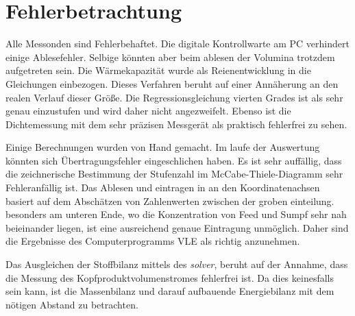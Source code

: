 \section{Fehlerbetrachtung}
\label{sec:fehler}

Alle Messonden sind Fehlerbehaftet. Die digitale Kontrollwarte am PC verhindert einige Ablesefehler. Selbige könnten aber beim ablesen der Volumina trotzdem aufgetreten sein. Die Wärmekapazität wurde als Reienentwicklung in die Gleichungen einbezogen. Dieses Verfahren beruht auf einer Annäherung an den realen Verlauf dieser Größe. Die Regressionsgleichung vierten Grades ist als sehr genau einzustufen und wird daher nicht angezweifelt. Ebenso ist die Dichtemessung mit dem sehr präzisen Messgerät als praktisch fehlerfrei zu sehen.

Einige Berechnungen wurden von Hand gemacht. Im laufe der Auswertung könnten sich Übertragungsfehler eingeschlichen haben. Es ist sehr auffällig, dass die zeichnerische Bestimmung der Stufenzahl im McCabe-Thiele-Diagramm sehr Fehleranfällig ist. Das Ablesen und eintragen in an den Koordinatenachsen basiert auf dem Abschätzen von Zahlenwerten zwischen der groben einteilung. besonders am unteren Ende, wo die Konzentration von Feed und Sumpf sehr nah beieinander liegen, ist eine ausreichend genaue Eintragung unmöglich. Daher sind die Ergebnisse des Computerprogramms VLE als richtig anzunehmen.


Das Ausgleichen der Stoffbilanz mittels des \emph{solver}, beruht auf der Annahme, dass die Messung des Kopfproduktvolumenstromes fehlerfrei ist. Da dies keinesfalls sein kann, ist die Massenbilanz und darauf aufbauende Energiebilanz mit dem nötigen Abstand zu betrachten.
